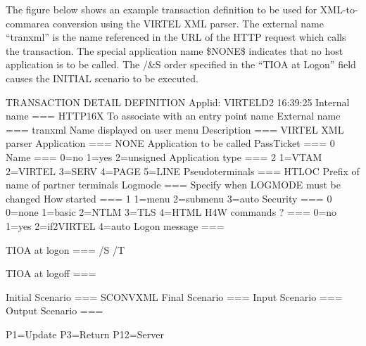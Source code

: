 \documentclass[letterpaper,10pt,english]{sphinxmanual}
\begin{document}


The figure below shows an example transaction definition to be used for XML-to-commarea conversion using the
VIRTEL XML parser. The external name “tranxml” is the name referenced in the URL of the HTTP request which calls
the transaction. The special application name \$NONE\$ indicates that no host application is to be called. The /\&S order
specified in the “TIOA at Logon” field causes the INITIAL scenario {\hyperref[\detokenize{User_Guide:v457ug-sconvxml}]{}} to be executed.

\begin{sphinxVerbatim}[commandchars=\\\{\}]
TRANSACTION DETAIL DEFINITION \PYGZhy{}\PYGZhy{}\PYGZhy{}\PYGZhy{}\PYGZhy{}\PYGZhy{}\PYGZhy{}\PYGZhy{}\PYGZhy{}\PYGZhy{}\PYGZhy{}\PYGZhy{}\PYGZhy{}\PYGZhy{}\PYGZhy{}\PYGZhy{}\PYGZhy{}\PYGZhy{}\PYGZhy{}\PYGZhy{}\PYGZhy{}\PYGZhy{} Applid: VIRTELD2 16:39:25
Internal name ===\PYGZgt{} HTTP\PYGZhy{}16X               To associate with an entry point name
External name ===\PYGZgt{} tranxml                Name displayed on user menu
Description   ===\PYGZgt{} VIRTEL XML parser
Application   ===\PYGZgt{} \PYGZdl{}NONE\PYGZdl{}                 Application to be called
PassTicket    ===\PYGZgt{} 0 Name ===\PYGZgt{}            0=no 1=yes 2=unsigned
Application type ===\PYGZgt{} 2                   1=VTAM 2=VIRTEL 3=SERV 4=PAGE 5=LINE
Pseudo\PYGZhy{}terminals ===\PYGZgt{} HTLOC               Prefix of name of partner terminals
Logmode ===\PYGZgt{}                              Specify when LOGMODE must be changed
How started ===\PYGZgt{} 1                        1=menu 2=sub\PYGZhy{}menu 3=auto
Security ===\PYGZgt{} 0                           0=none 1=basic 2=NTLM 3=TLS 4=HTML
H4W commands ? ===\PYGZgt{}                       0=no 1=yes 2=if2VIRTEL 4=auto
Logon message ===\PYGZgt{}

TIOA at logon ===\PYGZgt{} \PYGZam{}/S \PYGZam{}/T

TIOA at logoff ===\PYGZgt{}

Initial Scenario ===\PYGZgt{} SCONVXML            Final Scenario    ===\PYGZgt{}
Input Scenario   ===\PYGZgt{}                     Output Scenario   ===\PYGZgt{}

P1=Update P3=Return P12=Server
\end{sphinxVerbatim}
\end{document}
